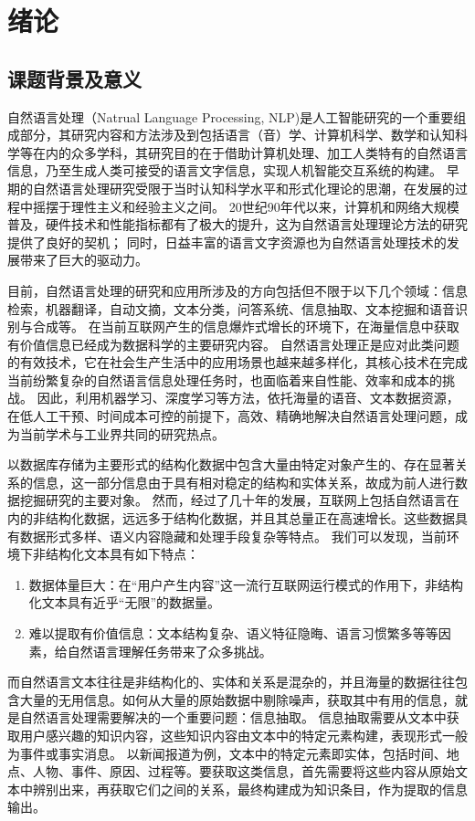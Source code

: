 \chapter{绪论}
\label{chap:introduction}
\section{课题背景及意义}
自然语言处理（Natrual Language Processing, NLP)是人工智能研究的一个重要组成部分，其研究内容和方法涉及到包括语言（音）学、计算机科学、数学和认知科学等在内的众多学科，其研究目的在于借助计算机处理、加工人类特有的自然语言信息，乃至生成人类可接受的语言文字信息，实现人机智能交互系统的构建。
早期的自然语言处理研究受限于当时认知科学水平和形式化理论的思潮，在发展的过程中摇摆于理性主义和经验主义之间。
20世纪90年代以来，计算机和网络大规模普及，硬件技术和性能指标都有了极大的提升，这为自然语言处理理论方法的研究提供了良好的契机；
同时，日益丰富的语言文字资源也为自然语言处理技术的发展带来了巨大的驱动力。

目前，自然语言处理的研究和应用所涉及的方向包括但不限于以下几个领域：信息检索，机器翻译，自动文摘，文本分类，问答系统、信息抽取、文本挖掘和语音识别与合成等。
在当前互联网产生的信息爆炸式增长的环境下，在海量信息中获取有价值信息已经成为数据科学的主要研究内容。
自然语言处理正是应对此类问题的有效技术，它在社会生产生活中的应用场景也越来越多样化，其核心技术在完成当前纷繁复杂的自然语言信息处理任务时，也面临着来自性能、效率和成本的挑战。
因此，利用机器学习、深度学习等方法，依托海量的语音、文本数据资源，在低人工干预、时间成本可控的前提下，高效、精确地解决自然语言处理问题，成为当前学术与工业界共同的研究热点。

以数据库存储为主要形式的结构化数据中包含大量由特定对象产生的、存在显著关系的信息，这一部分信息由于具有相对稳定的结构和实体关系，故成为前人进行数据挖掘研究的主要对象。
然而，经过了几十年的发展，互联网上包括自然语言在内的非结构化数据，远远多于结构化数据，并且其总量正在高速增长。这些数据具有数据形式多样、语义内容隐藏和处理手段复杂等特点。
我们可以发现，当前环境下非结构化文本具有如下特点：
\begin{enumerate}
    \item 数据体量巨大：在“用户产生内容”这一流行互联网运行模式的作用下，非结构化文本具有近乎“无限”的数据量。
    \item 难以提取有价值信息：文本结构复杂、语义特征隐晦、语言习惯繁多等等因素，给自然语言理解任务带来了众多挑战。
\end{enumerate}
而自然语言文本往往是非结构化的、实体和关系是混杂的，并且海量的数据往往包含大量的无用信息。如何从大量的原始数据中剔除噪声，获取其中有用的信息，就是自然语言处理需要解决的一个重要问题：信息抽取。
信息抽取需要从文本中获取用户感兴趣的知识内容，这些知识内容由文本中的特定元素构建，表现形式一般为事件或事实消息。
以新闻报道为例，文本中的特定元素即实体，包括时间、地点、人物、事件、原因、过程等。要获取这类信息，首先需要将这些内容从原始文本中辨别出来，再获取它们之间的关系，最终构建成为知识条目，作为提取的信息输出。

